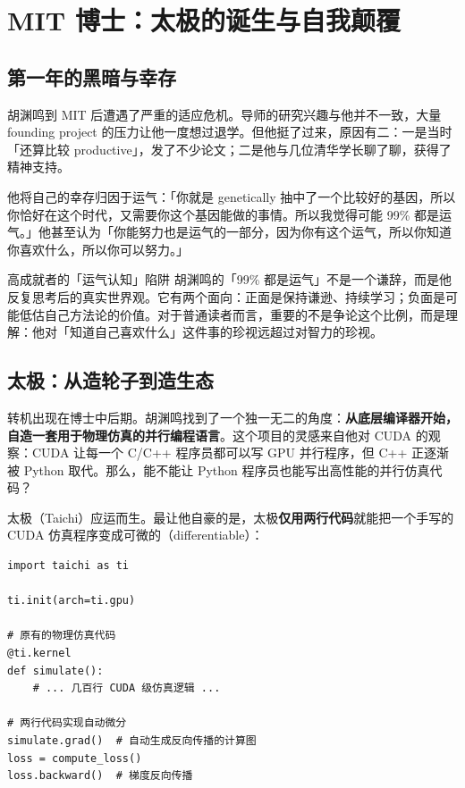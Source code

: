 \documentclass[a4paper]{article}
\begin{document}
\section{MIT 博士：太极的诞生与自我颠覆}

\subsection{第一年的黑暗与幸存}

胡渊鸣到 MIT 后遭遇了严重的适应危机。导师的研究兴趣与他并不一致，大量 founding project 的压力让他一度想过退学。但他挺了过来，原因有二：一是当时「还算比较 productive」，发了不少论文；二是他与几位清华学长聊了聊，获得了精神支持。

他将自己的幸存归因于运气：「你就是 genetically 抽中了一个比较好的基因，所以你恰好在这个时代，又需要你这个基因能做的事情。所以我觉得可能 99\% 都是运气。」他甚至认为「你能努力也是运气的一部分，因为你有这个运气，所以你知道你喜欢什么，所以你可以努力。」

\begin{warningbox}{高成就者的「运气认知」陷阱}
胡渊鸣的「99\% 都是运气」不是一个谦辞，而是他反复思考后的真实世界观。它有两个面向：正面是保持谦逊、持续学习；负面是可能低估自己方法论的价值。对于普通读者而言，重要的不是争论这个比例，而是理解：他对「知道自己喜欢什么」这件事的珍视远超过对智力的珍视。
\end{warningbox}

\subsection{太极：从造轮子到造生态}

转机出现在博士中后期。胡渊鸣找到了一个独一无二的角度：\textbf{从底层编译器开始，自造一套用于物理仿真的并行编程语言}。这个项目的灵感来自他对 CUDA 的观察：CUDA 让每一个 C/C++ 程序员都可以写 GPU 并行程序，但 C++ 正逐渐被 Python 取代。那么，能不能让 Python 程序员也能写出高性能的并行仿真代码？

太极（Taichi）应运而生。最让他自豪的是，太极\textbf{仅用两行代码}就能把一个手写的 CUDA 仿真程序变成可微的（differentiable）：

\begin{lstlisting}[caption={太极实现可微仿真的核心思路（示意）}, label={lst:taichi-diff}]
import taichi as ti

ti.init(arch=ti.gpu)

# 原有的物理仿真代码
@ti.kernel
def simulate():
    # ... 几百行 CUDA 级仿真逻辑 ...

# 两行代码实现自动微分
simulate.grad()  # 自动生成反向传播的计算图
loss = compute_loss()
loss.backward()  # 梯度反向传播
\end{lstlisting}
\end{document}
